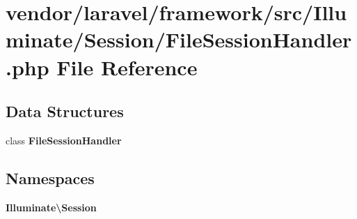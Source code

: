\section{vendor/laravel/framework/src/\+Illuminate/\+Session/\+File\+Session\+Handler.php File Reference}
\label{_file_session_handler_8php}
\subsection*{Data Structures}
\begin{DoxyCompactItemize}
\item 
class {\bf File\+Session\+Handler}
\end{DoxyCompactItemize}
\subsection*{Namespaces}
\begin{DoxyCompactItemize}
\item 
 {\bf Illuminate\textbackslash{}\+Session}
\end{DoxyCompactItemize}
